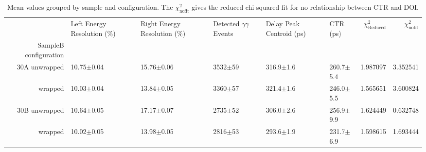 \begin{table}
\caption{\label{tab:doiresults} Mean values grouped by sample and configuration. The $\chi^2_\text{nofit}$ gives the reduced chi squared fit for no relationship between CTR and DOI.}
\begin{tabular}{rlllllrr}
\hline
& Left Energy Resolution (\%) & Right Energy Resolution (\%) & Detected $\gamma\gamma$ Events & Delay Peak Centroid (ps)  & CTR (ps) &  $\chi^2_\text{Reduced}$ &  $\chi^2_\text{nofit}$ \\
SampleB configuration &                      &                  &              &                &                &             &                        \\
\hline
30A    unwrapped     &       10.75$\pm$0.04 &   15.76$\pm$0.06 &  3532$\pm$59 &  316.9$\pm$1.6 &  260.7$\pm$5.4 &    1.987097 &               3.352541 \\
        wrapped       &       10.03$\pm$0.04 &   13.84$\pm$0.05 &  3360$\pm$57 &  321.4$\pm$1.6 &  246.0$\pm$5.5 &    1.565651 &               3.600824 \\
30B     unwrapped     &       10.64$\pm$0.05 &   17.17$\pm$0.07 &  2735$\pm$52 &  306.0$\pm$2.6 &  256.9$\pm$9.9 &    1.624449 &               0.632748 \\
        wrapped       &       10.02$\pm$0.05 &   13.98$\pm$0.05 &  2816$\pm$53 &  293.6$\pm$1.9 &  231.7$\pm$6.9 &    1.598615 &               1.693444 \\
\hline
\end{tabular}
\end{table}

